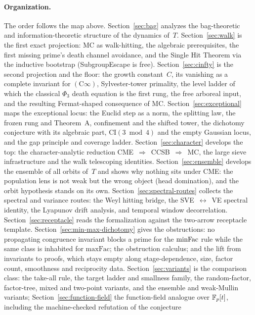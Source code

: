 \paragraph{Organization.}
The order follows the map above.
Section~\ref{sec:bag} analyzes the bag-theoretic and
information-theoretic structure of the dynamics of~$T$.
Section~\ref{sec:walk} is the first exact projection: MC as
walk-hitting, the algebraic prerequisites, the first missing prime's
death channel avoidance, and the Single Hit Theorem via the inductive
bootstrap (SubgroupEscape is free).
Section~\ref{sec:cinfty} is the second projection and the floor: the
growth constant~$C$, its vanishing as a complete invariant for
$(\mathrm{C}\infty)$, Sylvester-tower primality, the level ladder of
which the classical $\Phi_3$ death equation is the first rung, the free
arboreal input, and the resulting Fermat-shaped consequence of MC\@.
Section~\ref{sec:exceptional} maps the exceptional locus: the Euclid step
as a norm, the splitting law, the frozen rung and Theorem~A, confinement
and the shifted tower, the dichotomy conjecture with its algebraic part,
$\mathrm{CI}(3 \bmod 4)$ and the empty Gaussian locus, and the gap
principle and coverage ladder.
Section~\ref{sec:character} develops the top: the character-analytic
reduction CME~$\Rightarrow$~CCSB~$\Rightarrow$~MC, the large sieve
infrastructure and the walk telescoping identities.
Section~\ref{sec:ensemble} develops the ensemble of all orbits of~$T$
and shows why nothing sits under CME: the population lens is not weak but
the wrong object (head domination), and the orbit hypothesis stands on
its own.
Section~\ref{sec:spectral-routes} collects the spectral and variance
routes: the Weyl hitting bridge, the SVE~$\leftrightarrow$~VE spectral
identity, the Lyapunov drift analysis, and temporal window
decorrelation.
Section~\ref{sec:receptacle} reads the formalization against the
two-arrow receptacle template.
Section~\ref{sec:min-max-dichotomy} gives the obstructions: no
propagating congruence invariant blocks a prime for the $\mathrm{minFac}$ rule
while the same class is inhabited for $\mathrm{maxFac}$; the
obstruction calculus; and the lift from invariants to proofs, which
stays empty along stage-dependence, size, factor count, smoothness and
reciprocity data.
Section~\ref{sec:variants} is the comparison class: the take-all rule,
the target ladder and smallness family, the random-factor, factor-tree,
mixed and two-point variants, and the ensemble and weak-Mullin variants;
Section~\ref{sec:function-field} the function-field analogue over
$\mathbb{F}_p[t]$, including the machine-checked refutation of the conjecture
